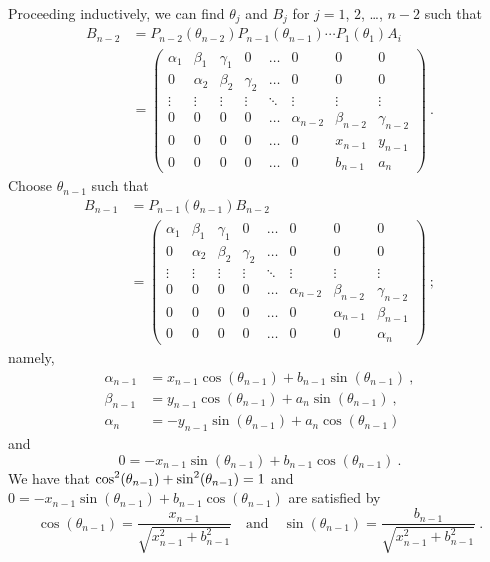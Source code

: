 Proceeding inductively, we can find $\theta_j$ and
$B_j$ for $j=1$, $2$, \ldots, $n-2$ such that
\begin{align*}
B_{n-2} &= P_{n-2}(\theta_{n-2}) P_{n-1}(\theta_{n-1}) \cdots P_1(\theta_1) A_i \\
&=
\begin{pmatrix}
\alpha_1 & \beta_1 & \gamma_1 & 0 & \ldots & 0 & 0 & 0 \\
0 & \alpha_2 & \beta_2 & \gamma_2 & \ldots & 0 & 0 & 0 \\
\vdots & \vdots & \vdots & \vdots & \ddots & \vdots & \vdots & \vdots \\
0 & 0 & 0 & 0 & \ldots & \alpha_{n-2} & \beta_{n-2} & \gamma_{n-2} \\ 
0 & 0 & 0 & 0 & \ldots & 0 & x_{n-1} & y_{n-1} \\
0 & 0 & 0 & 0 & \ldots & 0 & b_{n-1} & a_{n} 
\end{pmatrix} \ .
\end{align*}
Choose $\theta_{n-1}$ such that
\begin{align*}
B_{n-1} &= P_{n-1}(\theta_{n-1}) B_{n-2} \\
&=
\begin{pmatrix}
\alpha_1 & \beta_1 & \gamma_1 & 0 & \ldots & 0 & 0 & 0 \\
0 & \alpha_2 & \beta_2 & \gamma_2 & \ldots & 0 & 0 & 0 \\
\vdots & \vdots & \vdots & \vdots & \ddots & \vdots & \vdots & \vdots \\
0 & 0 & 0 & 0 & \ldots & \alpha_{n-2} & \beta_{n-2} & \gamma_{n-2} \\ 
0 & 0 & 0 & 0 & \ldots & 0 & \alpha_{n-1} & \beta_{n-1} \\
0 & 0 & 0 & 0 & \ldots & 0 & 0 & \alpha_n 
\end{pmatrix} \ ;
\end{align*}
namely,
\begin{equation}\label{C14L38}
\begin{split}
\alpha_{n-1} &= x_{n-1} \cos(\theta_{n-1}) + b_{n-1} \sin(\theta_{n-1}) \ , \\
\beta_{n-1} &= y_{n-1} \cos(\theta_{n-1}) + a_n \sin(\theta_{n-1}) \ , \\
\alpha_n &= - y_{n-1} \sin(\theta_{n-1}) + a_n \cos(\theta_{n-1})
\end{split}
\end{equation}
and
\[
0 = -x_{n-1} \sin(\theta_{n-1}) + b_{n-1} \cos(\theta_{n-1}) \ .
\]
We have that $\displaystyle \cos^2(\theta_{n-1})+\sin^2(\theta_{n-1}) = 1$ and
$0 = -x_{n-1} \sin(\theta_{n-1}) + b_{n-1} \cos(\theta_{n-1})$ are
satisfied by
\begin{equation} \label{C14L39}
\cos(\theta_{n-1}) = \frac{x_{n-1}}{\sqrt{x_{n-1}^2 + b_{n-1}^2}} \quad
\text{and} \quad
\sin(\theta_{n-1}) = \frac{b_{n-1}}{\sqrt{x_{n-1}^2 + b_{n-1}^2}} \ .
\end{equation}

